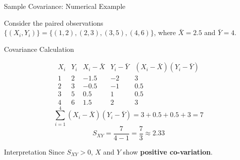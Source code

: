 \documentclass{beamer}
\begin{document}
\begin{frame}{Sample Covariance: Numerical Example}

Consider the paired observations
$\{(X_i,Y_i)\}=\{(1,2),(2,3),(3,5),(4,6)\}$,
where $\bar X=2.5$ and $\bar Y=4$.

\vspace{0.1cm}

\begin{block}{Covariance Calculation}

\centering
\renewcommand{\arraystretch}{1.1}
\scriptsize

\[
\begin{array}{c|c|c|c|c}
X_i & Y_i &
X_i-\bar X &
Y_i-\bar Y &
(X_i-\bar X)(Y_i-\bar Y)\\
\hline
1 & 2 & -1.5 & -2 & 3\\
2 & 3 & -0.5 & -1 & 0.5\\
3 & 5 & 0.5  & 1  & 0.5\\
4 & 6 & 1.5  & 2  & 3
\end{array}
\]
\vspace{0.01cm}
\[
\sum_{i=1}^{4}(X_i-\bar X)(Y_i-\bar Y)
=3+0.5+0.5+3=7
\]
\vspace{-0.1cm}
\[
\boxed{
S_{XY}
=
\frac{7}{4-1}
=
\frac{7}{3}
\approx 2.33
}
\]
\end{block}

\vspace{0.05cm}

\begin{block}{Interpretation}
Since $S_{XY}>0$, $X$ and $Y$ show \textbf{positive co-variation}.
\end{block}

\end{frame}

\end{document}
